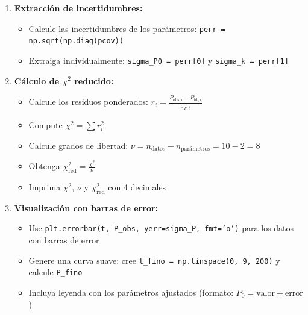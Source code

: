 \documentclass[10pt]{article}
\begin{document}
\begin{tcolorbox}[title={Pregunta 3 – Crecimiento Bacteriano (scipy.optimize.curve\_fit)}]
\begin{enumerate}
  \item \textbf{Extracción de incertidumbres:}
  \begin{itemize}
    \item Calcule las incertidumbres de los parámetros: \texttt{perr = np.sqrt(np.diag(pcov))}
    \item Extraiga individualmente: \texttt{sigma\_P0 = perr[0]} y \texttt{sigma\_k = perr[1]}
  \end{itemize}
  
  \item \textbf{Cálculo de $\chi^2$ reducido:}
  \begin{itemize}
    \item Calcule los residuos ponderados: $r_i = \frac{P_{\text{obs},i} - P_{\text{fit},i}}{\sigma_{P,i}}$
    \item Compute $\chi^2 = \sum r_i^2$
    \item Calcule grados de libertad: $\nu = n_{\text{datos}} - n_{\text{parámetros}} = 10 - 2 = 8$
    \item Obtenga $\chi^2_{\text{red}} = \frac{\chi^2}{\nu}$
    \item Imprima $\chi^2$, $\nu$ y $\chi^2_{\text{red}}$ con 4 decimales
  \end{itemize}
  
  \item \textbf{Visualización con barras de error:}
  \begin{itemize}
    \item Use \texttt{plt.errorbar(t, P\_obs, yerr=sigma\_P, fmt='o')} para los datos con barras de error
    \item Genere una curva suave: cree \texttt{t\_fino = np.linspace(0, 9, 200)} y calcule \texttt{P\_fino}
    \item Incluya leyenda con los parámetros ajustados (formato: $P_0 = \text{valor} \pm \text{error}$)
  \end{itemize}
  
\end{enumerate}


\end{tcolorbox}

\end{document}
